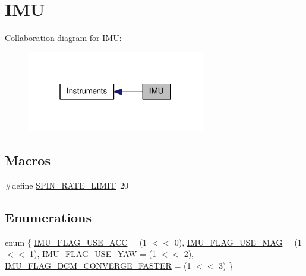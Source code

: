 \hypertarget{group__IMU}{\section{I\+M\+U}
\label{group__IMU}
}
Collaboration diagram for I\+M\+U\+:\nopagebreak
\begin{figure}[H]
\begin{center}
\leavevmode
\includegraphics[width=220pt]{group__IMU}
\end{center}
\end{figure}
\subsection*{Macros}
\begin{DoxyCompactItemize}
\item 
\#define \hyperlink{group__IMU_ga86bbc61e689c15e74cf01916d16894fe}{S\+P\+I\+N\+\_\+\+R\+A\+T\+E\+\_\+\+L\+I\+M\+I\+T}~20
\end{DoxyCompactItemize}
\subsection*{Enumerations}
\begin{DoxyCompactItemize}
\item 
enum \{ \hyperlink{group__IMU_ggaae05225933a42f81e7c4a9fb286596f9a399b1b9b14b617da7b7e8c80a3f97b5a}{I\+M\+U\+\_\+\+F\+L\+A\+G\+\_\+\+U\+S\+E\+\_\+\+A\+C\+C} = (1 $<$$<$ 0), 
\hyperlink{group__IMU_ggaae05225933a42f81e7c4a9fb286596f9a186ac11170a21b97a4fbc4a59a19370a}{I\+M\+U\+\_\+\+F\+L\+A\+G\+\_\+\+U\+S\+E\+\_\+\+M\+A\+G} = (1 $<$$<$ 1), 
\hyperlink{group__IMU_ggaae05225933a42f81e7c4a9fb286596f9afc683ea06e572c5c8d5ec2e1d5f74b43}{I\+M\+U\+\_\+\+F\+L\+A\+G\+\_\+\+U\+S\+E\+\_\+\+Y\+A\+W} = (1 $<$$<$ 2), 
\hyperlink{group__IMU_ggaae05225933a42f81e7c4a9fb286596f9ab4e9ab0f17f61f7db2b77d7506d85319}{I\+M\+U\+\_\+\+F\+L\+A\+G\+\_\+\+D\+C\+M\+\_\+\+C\+O\+N\+V\+E\+R\+G\+E\+\_\+\+F\+A\+S\+T\+E\+R} = (1 $<$$<$ 3)
 \}
\end{DoxyCompactItemize}
